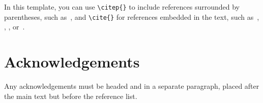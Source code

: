 \documentclass{article}
\begin{document}
In this template, you can use \verb=\citep{}= to include references
surrounded by parentheses, such as~\citep{KneesS16_MusicSimilarityRetrieval_SPRINGER}, and \verb=\cite{}=
for references embedded in the text,
such as~\cite{WeihsJVR16_MusicDataAnalysis_CRC},
\cite{SerraEtAl13_RoadmapMIR_CreativeCommon},
\cite{Lerch15_AudioContentAnalysis_WILEY},
or~\cite{Mueller15_FMP_SPRINGER}.



\section*{Acknowledgements}

Any acknowledgements must be headed and in a separate paragraph,
placed after the main text but before the reference list.




%
%
%
%
\end{document}
